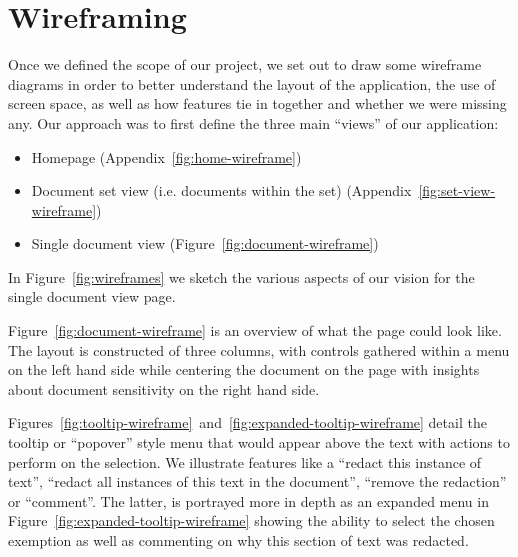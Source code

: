 \documentclass[\version]{l4proj}
\begin{document}
\section{Wireframing}

Once we defined the scope of our project, we set out to draw some wireframe diagrams in order to better understand the layout of the application, the use of screen space, as well as how features tie in together and whether we were missing any.
Our approach was to first define the three main ``views'' of our application:

\begin{itemize}[noitemsep,nolistsep]
    \item Homepage (Appendix~\ref{fig:home-wireframe})
    \item Document set view (i.e. documents within the set) (Appendix~\ref{fig:set-view-wireframe})
    \item Single document view (Figure~\ref{fig:document-wireframe})
\end{itemize}

In Figure~\ref{fig:wireframes} we sketch the various aspects of our vision for the single document view page.

Figure~\ref{fig:document-wireframe} is an overview of what the page could look like.
The layout is constructed of three columns, with controls gathered within a menu on the left hand side while centering the document on the page with insights about document sensitivity on the right hand side.

Figures~\ref{fig:tooltip-wireframe}~and~\ref{fig:expanded-tooltip-wireframe} detail the tooltip or ``popover'' style menu that would appear above the text with actions to perform on the selection.
We illustrate features like a ``redact this instance of text'', ``redact all instances of this text in the document'', ``remove the redaction'' or ``comment''.
The latter, is portrayed more in depth as an expanded menu in Figure~\ref{fig:expanded-tooltip-wireframe} showing the ability to select the chosen exemption as well as commenting on why this section of text was redacted.
\end{document}
